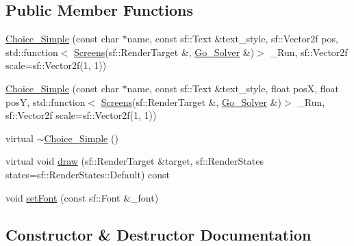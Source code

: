 \subsection*{Public Member Functions}
\begin{DoxyCompactItemize}
\item 
\hyperlink{class_choice___simple_aba8dc060adb5b2f393bbfb3d09127761}{Choice\+\_\+\+Simple} (const char $\ast$name, const sf\+::\+Text \&text\+\_\+style, sf\+::\+Vector2f pos, std\+::function$<$ \hyperlink{_globals_8h_a3d5776bab98402b03be09156bacf4f68}{Screens}(sf\+::\+Render\+Target \&, \hyperlink{class_go___solver}{Go\+\_\+\+Solver} \&)$>$ \+\_\+\+Run, sf\+::\+Vector2f scale=sf\+::\+Vector2f(1, 1))
\item 
\hyperlink{class_choice___simple_a00412cfa29b144f0aca041b93fab4b26}{Choice\+\_\+\+Simple} (const char $\ast$name, const sf\+::\+Text \&text\+\_\+style, float posX, float posY, std\+::function$<$ \hyperlink{_globals_8h_a3d5776bab98402b03be09156bacf4f68}{Screens}(sf\+::\+Render\+Target \&, \hyperlink{class_go___solver}{Go\+\_\+\+Solver} \&)$>$ \+\_\+\+Run, sf\+::\+Vector2f scale=sf\+::\+Vector2f(1, 1))
\item 
virtual \hyperlink{class_choice___simple_a6d5b3fe8aa2969f8eaffa4e5fd3b47d9}{$\sim$\+Choice\+\_\+\+Simple} ()
\item 
virtual void \hyperlink{class_choice___simple_ae8f4cedc34a10d3c35efce8cec1bec54}{draw} (sf\+::\+Render\+Target \&target, sf\+::\+Render\+States states=sf\+::\+Render\+States\+::\+Default) const
\item 
void \hyperlink{class_choice___simple_a035e32f90e4561b666b6571bce06e207}{set\+Font} (const sf\+::\+Font \&\+\_\+font)
\end{DoxyCompactItemize}


\subsection{Constructor \& Destructor Documentation}
\mbox{\label{class_choice___simple_aba8dc060adb5b2f393bbfb3d09127761}} 
